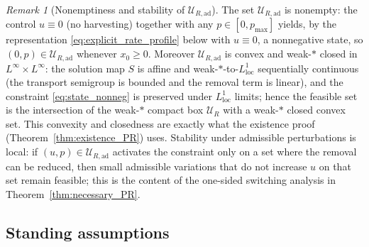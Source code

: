 \documentclass[pdflatex,sn-mathphys-num]{sn-jnl}
\theoremstyle{definition}
\theoremstyle{remark}
\newtheorem{remark}[theorem]{Remark}
\begin{document}
\begin{remark}[Nonemptiness and stability of $\mathcal{U}_{R,\mathrm{ad}}$]
\label{rem:URad}
The set $\mathcal{U}_{R,\mathrm{ad}}$ is nonempty: the control $u\equiv0$
(no harvesting) together with any $p\in[0,p_{\max}]$ yields, by the
representation \eqref{eq:explicit_rate_profile} below with $u\equiv0$, a
nonnegative state, so $(0,p)\in\mathcal{U}_{R,\mathrm{ad}}$ whenever
$x_0\ge0$. Moreover $\mathcal{U}_{R,\mathrm{ad}}$ is convex and weak-$\ast$
closed in $L^\infty\times L^\infty$: the solution map $S$ is affine and
weak-$\ast$-to-$L^1_{\mathrm{loc}}$ sequentially continuous (the transport
semigroup is bounded and the removal term is linear), and the constraint
\eqref{eq:state_nonneg} is preserved under $L^1_{\mathrm{loc}}$ limits;
hence the feasible set is the intersection of the weak-$\ast$ compact box
$\mathcal{U}_R$ with a weak-$\ast$ closed convex set. This convexity and
closedness are exactly what the existence proof
(Theorem~\ref{thm:existence_PR}) uses. Stability under admissible
perturbations is local: if $(u,p)\in\mathcal{U}_{R,\mathrm{ad}}$ activates
the constraint only on a set where the removal can be reduced, then small
admissible variations that do not increase $u$ on that set remain feasible;
this is the content of the one-sided switching analysis in
Theorem~\ref{thm:necessary_PR}.
\end{remark}


\subsection{Standing assumptions}
\end{document}
